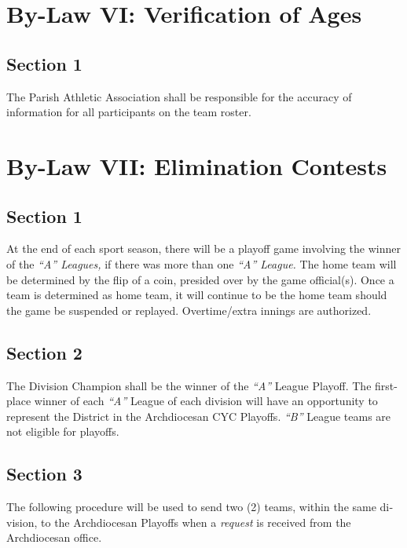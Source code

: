 \section{By-Law VI: Verification of Ages}
\label{sec:bylaw-6}
\subsection{Section 1}
\label{ssec:bylaw-6-1}
The Parish Athletic Association shall be responsible for the accuracy of information for all participants on the team roster.

\section{By-Law VII: Elimination Contests}
\label{sec:bylaw-7}
\subsection{Section 1}
\label{ssec:bylaw-7-1}
At the end of each sport season, there will be a playoff game involving the win­ner of the {\em ``A'' Leagues,} if there was more than one {\em “A” League.}  The home team will be determined by the flip of a coin, pre­sided over by the game official(s).  Once a team is determined as home team, it will continue to be the home team should the game be suspended or replayed.   Overtime/extra innings are authorized.

\subsection{Section 2}
\label{ssec:bylaw-7-2}
The Division Champion shall be the winner of the {\em ``A''} League Playoff.  The first-place winner of each {\em ``A''} League of each division will have an opportunity to represent the District in the Archdiocesan CYC Playoffs. {\em ``B''} League teams are not eligible for playoffs.

\subsection{Section 3}
\label{ssec:bylaw-7-3}
The following procedure will be used to send two (2) teams, within the same di­vision, to the Archdiocesan Playoffs when a {\em request} is received from the Archdiocesan office.

